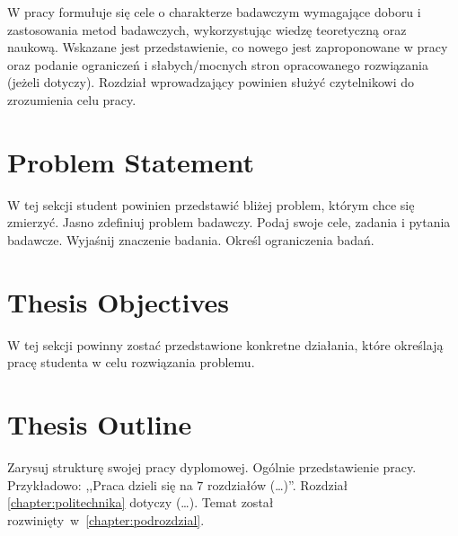 \label{chapter:introduction}
W pracy formułuje się cele o charakterze badawczym wymagające doboru i zastosowania metod badawczych, wykorzystując wiedzę teoretyczną oraz naukową. Wskazane jest przedstawienie, co nowego jest zaproponowane w pracy oraz podanie ograniczeń i słabych/mocnych stron opracowanego rozwiązania (jeżeli dotyczy). Rozdział wprowadzający powinien służyć czytelnikowi do zrozumienia celu pracy.

\section{Problem Statement}
W tej sekcji student powinien przedstawić bliżej problem, którym chce się zmierzyć. Jasno zdefiniuj problem badawczy. Podaj swoje cele, zadania i pytania badawcze. Wyjaśnij znaczenie badania. Określ ograniczenia badań.


\section{Thesis Objectives}
W tej sekcji powinny zostać przedstawione konkretne działania, które określają pracę studenta w celu rozwiązania problemu.


\section{Thesis Outline}
Zarysuj strukturę swojej pracy dyplomowej. Ogólnie przedstawienie pracy. Przykładowo: ,,Praca dzieli się na $7$ rozdziałów (\dots)''. Rozdział \ref{chapter:politechnika} dotyczy (\dots). Temat został rozwinięty~w~\ref{chapter:podrozdzial}.